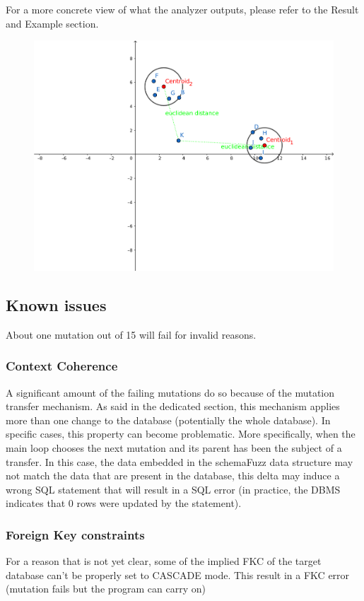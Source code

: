 \documentclass{article}
\begin{document}
\begin{empfile}
For a more concrete view of what the analyzer outputs, please refer to the Result and Example section. 
\begin{figure} [h!]
  \includegraphics[width=\textwidth]{Scoring.png}
\end{figure}	
		\subsection{Known issues}		
About one mutation out of 15 will fail for invalid reasons.
			\subsubsection{Context Coherence}
A significant amount of the failing mutations do so because of the mutation transfer mechanism. As said in the dedicated section, this mechanism applies more than one change to the database (potentially the whole database). In specific cases, this property can become problematic. 
More specifically, when the main loop chooses the next mutation and its parent has been the subject of a transfer. In this case, the data embedded in the schemaFuzz data structure may not match the data that are present in the database, this delta may induce a wrong SQL statement that will result in a SQL error (in practice, the DBMS indicates that 0 rows were updated by the statement).
			\subsubsection{Foreign Key constraints}			
For a reason that is not yet clear, some of the implied FKC of the target database can't be properly set to CASCADE mode. This result in a FKC error (mutation fails but the program can carry on)			

\end{empfile}
\end{document}
